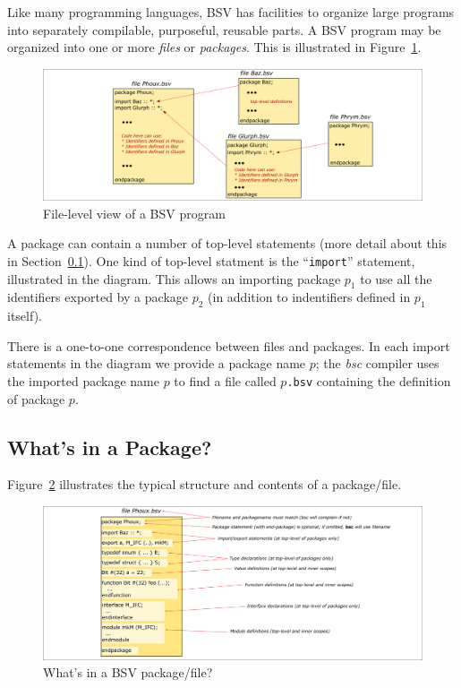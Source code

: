 
Like many programming languages, BSV has facilities to organize large
programs into separately compilable, purposeful, reusable parts.  A
BSV program may be organized into one or more \emph{files} or
\emph{packages}.  This is illustrated in
Figure~\ref{Fig_BSV_program_structure}.
\begin{figure}[htbp]
  \centerline{\includegraphics[width=6in,angle=0]{Figures/Fig_BSV_program_structure}}
  \caption{\label{Fig_BSV_program_structure}
           File-level view of a BSV program}
\end{figure}

A package can contain a number of top-level statements (more detail
about this in Section~\ref{Sec_package_contents}).  One kind of
top-level statment is the ``\verb|import|'' statement, illustrated in
the diagram.  This allows an importing package $p_1$ to use all the
identifiers exported by a package $p_2$ (in addition to indentifiers
defined in $p_1$ itself).

There is a one-to-one correspondence between files and packages.  In
each import statements in the diagram we provide a package name $p$;
the \emph{bsc} compiler uses the imported package name $p$ to find a
file called $p$\verb|.bsv| containing the definition of package $p$.


\subsection{What's in a Package?}

\label{Sec_package_contents}

Figure~\ref{Fig_BSV_Package} illustrates the typical
structure and contents of a package/file.
\begin{figure}[htbp]
  \centerline{\includegraphics[width=6in,angle=0]{Figures/Fig_BSV_Package}}
  \caption{\label{Fig_BSV_Package}
           What's in a BSV package/file?}
\end{figure}


